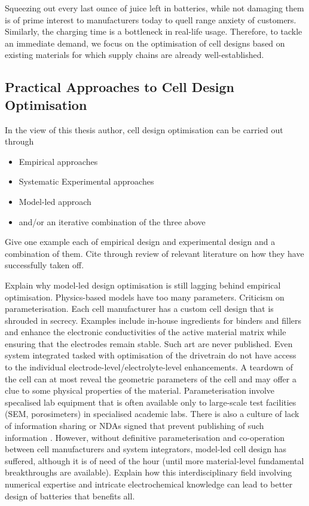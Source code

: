 Squeezing out  every last ounce of  juice left in batteries,  while not damaging
them  is of  prime interest  to manufacturers  today to  quell range  anxiety of
customers.  Similarly, the  charging time  is a  bottleneck in  real-life usage.
Therefore, to tackle  an immediate demand, we focus on  the optimisation of cell
designs  based  on  existing  materials  for which  supply  chains  are  already
well-established.

\subsection{Practical Approaches to Cell Design Optimisation}

In the view of this thesis author, cell design optimisation can be carried out through
\begin{itemize}
    \item Empirical approaches
    \item Systematic Experimental approaches
    \item Model-led approach
    \item and/or an iterative combination of the three above
\end{itemize}

Give  one  example each  of  empirical  design  and  experimental design  and  a
combination of them. Cite through review of relevant literature on how they have
successfully taken off.

Explain  why model-led  design optimisation  is still  lagging behind  empirical
optimisation.  Physics-based  models  have  too many  parameters.  Criticism  on
parameterisation.  Each cell  manufacturer  has  a custom  cell  design that  is
shrouded  in secrecy.  Examples  include in-house  ingredients  for binders  and
fillers and enhance the electronic  conductivities of the active material matrix
while ensuring that the electrodes remain  stable. Such art are never published.
Even system  integrated tasked with optimisation  of the drivetrain do  not have
access  to  the  individual  electrode-level/electrolyte-level  enhancements.  A
teardown of the cell can at most reveal the geometric parameters of the cell and
may offer a  clue to some physical properties of  the material. Parameterisation
involve specalised  lab equipment  that is often  available only  to large-scale
test  facilities (SEM,  porosimeters)  in specialised  academic  labs. There  is
also  a culture  of lack  of  information sharing  or NDAs  signed that  prevent
publishing of  such information  . However, without  definitive parameterisation
and co-operation  between cell  manufacturers and system  integrators, model-led
cell  design  has  suffered,  although  it   is  of  need  of  the  hour  (until
more  material-level  fundamental  breakthroughs  are  available).  Explain  how
this  interdisciplinary  field  involving   numerical  expertise  and  intricate
electrochemical knowledge can  lead to better design of  batteries that benefits
all.

